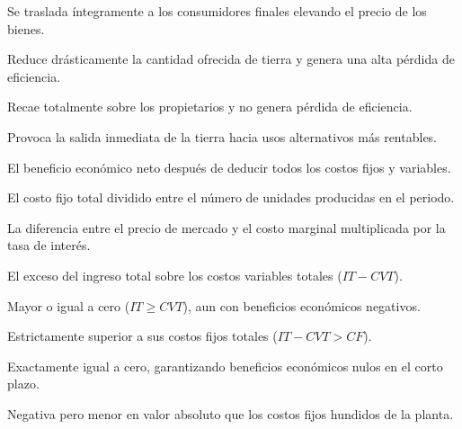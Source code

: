 \begin{opts}
    \item Se traslada íntegramente a los consumidores finales elevando el precio de los bienes.
    \item Reduce drásticamente la cantidad ofrecida de tierra y genera una alta pérdida de eficiencia.
    \item Recae totalmente sobre los propietarios y no genera pérdida de eficiencia.
    \item Provoca la salida inmediata de la tierra hacia usos alternativos más rentables.
\end{opts}

\begin{opts}
    \item El beneficio económico neto después de deducir todos los costos fijos y variables.
    \item El costo fijo total dividido entre el número de unidades producidas en el periodo.
    \item La diferencia entre el precio de mercado y el costo marginal multiplicada por la tasa de interés.
    \item El exceso del ingreso total sobre los costos variables totales ($IT - CVT$).
\end{opts}

\begin{opts}
    \item Mayor o igual a cero ($IT \ge CVT$), aun con beneficios económicos negativos.
    \item Estrictamente superior a sus costos fijos totales ($IT - CVT > CF$).
    \item Exactamente igual a cero, garantizando beneficios económicos nulos en el corto plazo.
    \item Negativa pero menor en valor absoluto que los costos fijos hundidos de la planta.
\end{opts}

